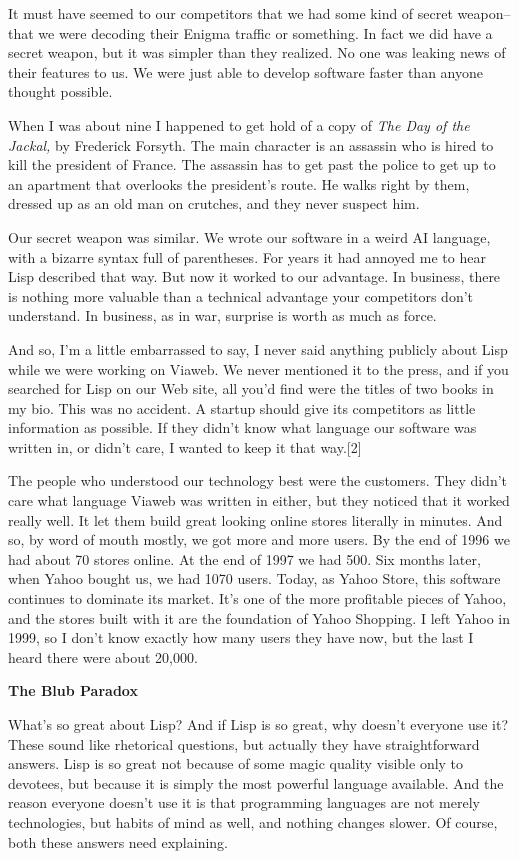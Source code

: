 It must have seemed to our competitors that we had some kind of secret
weapon-- that we were decoding their Enigma traffic or something. In
fact we did have a secret weapon, but it was simpler than they realized.
No one was leaking news of their features to us. We were just able to
develop software faster than anyone thought possible.

When I was about nine I happened to get hold of a copy of \emph{The Day
of the Jackal,} by Frederick Forsyth. The main character is an assassin
who is hired to kill the president of France. The assassin has to get
past the police to get up to an apartment that overlooks the president's
route. He walks right by them, dressed up as an old man on crutches, and
they never suspect him.

Our secret weapon was similar. We wrote our software in a weird AI
language, with a bizarre syntax full of parentheses. For years it had
annoyed me to hear Lisp described that way. But now it worked to our
advantage. In business, there is nothing more valuable than a technical
advantage your competitors don't understand. In business, as in war,
surprise is worth as much as force.

And so, I'm a little embarrassed to say, I never said anything publicly
about Lisp while we were working on Viaweb. We never mentioned it to the
press, and if you searched for Lisp on our Web site, all you'd find were
the titles of two books in my bio. This was no accident. A startup
should give its competitors as little information as possible. If they
didn't know what language our software was written in, or didn't care, I
wanted to keep it that way.{[}2{]}

The people who understood our technology best were the customers. They
didn't care what language Viaweb was written in either, but they noticed
that it worked really well. It let them build great looking online
stores literally in minutes. And so, by word of mouth mostly, we got
more and more users. By the end of 1996 we had about 70 stores online.
At the end of 1997 we had 500. Six months later, when Yahoo bought us,
we had 1070 users. Today, as Yahoo Store, this software continues to
dominate its market. It's one of the more profitable pieces of Yahoo,
and the stores built with it are the foundation of Yahoo Shopping. I
left Yahoo in 1999, so I don't know exactly how many users they have
now, but the last I heard there were about 20,000.

\textbf{The Blub Paradox}

What's so great about Lisp? And if Lisp is so great, why doesn't
everyone use it? These sound like rhetorical questions, but actually
they have straightforward answers. Lisp is so great not because of some
magic quality visible only to devotees, but because it is simply the
most powerful language available. And the reason everyone doesn't use it
is that programming languages are not merely technologies, but habits of
mind as well, and nothing changes slower. Of course, both these answers
need explaining.


